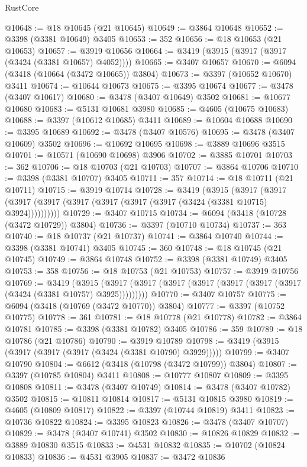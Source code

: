 \begin{lexlean}{RustCore}
\begin{coremodule}
@10648 := @18 @10645 (@21 @10645)
@10649 := @3864 @10648
@10652 := @3398 (@3381 @10649) @3405
@10653 := 352
@10656 := @18 @10653 (@21 @10653)
@10657 := @3919 @10656
@10664 := @3419 (@3915 (@3917 (@3917 (@3424 (@3381 @10657) @4052))))
@10665 := @3407 @10657
@10670 := @6094 (@3418 (@10664 (@3472 @10665)) @3804)
@10673 := @3397 (@10652 @10670) @3411
@10674 := @10644 @10673
@10675 := @3395 @10674
@10677 := @3478 (@3407 @10617)
@10680 := @3478 (@3407 @10649) @3502
@10681 := @10677 @10680
@10683 := @5131 @10681 @3980
@10685 := @4605 (@10675 @10683)
@10688 := @3397 (@10612 @10685) @3411
@10689 := @10604 @10688
@10690 := @3395 @10689
@10692 := @3478 (@3407 @10576)
@10695 := @3478 (@3407 @10609) @3502
@10696 := @10692 @10695
@10698 := @3889 @10696 @3515
@10701 := @10571 (@10690 @10698) @3906
@10702 := @3885 @10701
@10703 := 362
@10706 := @18 @10703 (@21 @10703)
@10707 := @3864 @10706
@10710 := @3398 (@3381 @10707) @3405
@10711 := 357
@10714 := @18 @10711 (@21 @10711)
@10715 := @3919 @10714
@10728 := @3419
    (@3915
      (@3917 (@3917 (@3917 (@3917 (@3917 (@3917 (@3917 (@3917 (@3424 (@3381 @10715) @3924))))))))))
@10729 := @3407 @10715
@10734 := @6094 (@3418 (@10728 (@3472 @10729)) @3804)
@10736 := @3397 (@10710 @10734)
@10737 := 363
@10740 := @18 @10737 (@21 @10737)
@10741 := @3864 @10740
@10744 := @3398 (@3381 @10741) @3405
@10745 := 360
@10748 := @18 @10745 (@21 @10745)
@10749 := @3864 @10748
@10752 := @3398 (@3381 @10749) @3405
@10753 := 358
@10756 := @18 @10753 (@21 @10753)
@10757 := @3919 @10756
@10769 := @3419
    (@3915 (@3917 (@3917 (@3917 (@3917 (@3917 (@3917 (@3917 (@3424 (@3381 @10757) @3925)))))))))
@10770 := @3407 @10757
@10775 := @6094 (@3418 (@10769 (@3472 @10770)) @3804)
@10777 := @3397 (@10752 @10775)
@10778 := 361
@10781 := @18 @10778 (@21 @10778)
@10782 := @3864 @10781
@10785 := @3398 (@3381 @10782) @3405
@10786 := 359
@10789 := @18 @10786 (@21 @10786)
@10790 := @3919 @10789
@10798 := @3419 (@3915 (@3917 (@3917 (@3917 (@3424 (@3381 @10790) @3929)))))
@10799 := @3407 @10790
@10804 := @6612 (@3418 (@10798 (@3472 @10799)) @3804)
@10807 := @3397 (@10785 @10804) @3411
@10808 := @10777 @10807
@10809 := @3395 @10808
@10811 := @3478 (@3407 @10749)
@10814 := @3478 (@3407 @10782) @3502
@10815 := @10811 @10814
@10817 := @5131 @10815 @3980
@10819 := @4605 (@10809 @10817)
@10822 := @3397 (@10744 @10819) @3411
@10823 := @10736 @10822
@10824 := @3395 @10823
@10826 := @3478 (@3407 @10707)
@10829 := @3478 (@3407 @10741) @3502
@10830 := @10826 @10829
@10832 := @3889 @10830 @3515
@10833 := @4531 @10832
@10835 := @10702 (@10824 @10833)
@10836 := @4531 @3905
@10837 := @3472 @10836

\end{coremodule}
\end{lexlean}

